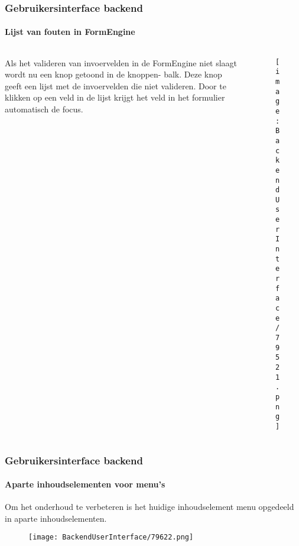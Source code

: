 \begin{frame}[fragile]
	\frametitle{Gebruikersinterface backend}
	\framesubtitle{Lijst van fouten in FormEngine}

	\begin{columns}[T]
		\begin{column}{.35\textwidth}
			Als het valideren van invoervelden in de FormEngine niet slaagt wordt nu een knop
			getoond in de knoppen- balk. Deze knop geeft een lijst met de invoervelden die niet
			valideren. Door te klikken op een veld in de lijst krijgt het veld in het formulier
			automatisch de focus.
		\end{column}

		\begin{column}{.65\textwidth}
			\begin{figure}\vspace*{-0.6cm}
				\texttt{[image: BackendUserInterface/79521.png]}
			\end{figure}
		\end{column}
	\end{columns}

\end{frame}

\begin{frame}[fragile]
	\frametitle{Gebruikersinterface backend}
	\framesubtitle{Aparte inhoudselementen voor menu's}

	Om het onderhoud te verbeteren is het huidige inhoudselement menu opgedeeld in
	aparte inhoudselementen.

	\begin{figure}\vspace{-0.2cm}
		\texttt{[image: BackendUserInterface/79622.png]}
	\end{figure}

\end{frame}

